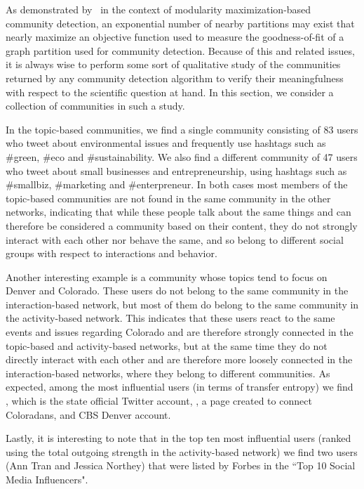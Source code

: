 As demonstrated by~\cite{good2010performance} in the context of modularity maximization-based community detection, an exponential number of nearby partitions may exist that nearly maximize an objective function used to measure the goodness-of-fit of a graph partition used for community detection. Because of this and related issues, it is always wise to perform some sort of qualitative study of the communities returned by any  community detection algorithm to verify their meaningfulness with respect to the scientific question at hand. In this section, we consider a collection of communities in such a study. 

In the topic-based communities, we find a single community consisting of 83 users who tweet about environmental issues and frequently use hashtags such as \#green, \#eco and \#sustainability. We also find a different community of 47 users who tweet about small businesses and entrepreneurship, using hashtags such as \#smallbiz, \#marketing and \#enterpreneur. In both cases most members of the topic-based communities are not found in the same community in the other networks, indicating that while these people talk about the same things and can therefore be considered a community based on their content, they do not strongly interact with each other nor behave the same, and so belong to different social groups with respect to interactions and behavior.

Another interesting example is a community whose topics tend to focus on Denver and Colorado. These users do not belong to the same community in the interaction-based network, but most of them do belong to the same community in the activity-based network. This indicates that these users react to the same events and issues regarding Colorado and are therefore strongly connected in the topic-based and activity-based networks, but at the same time they do not directly interact with each other and are therefore more loosely connected in the interaction-based networks, where they belong to different communities. As expected, among the most influential users (in terms of transfer entropy) we find \@Colorado, which is the state official Twitter account, \@ConnectColorado, a page created to connect Coloradans, and CBS Denver account.

Lastly, it is interesting to note that in the top ten most influential users (ranked using the total outgoing strength in the activity-based network) we find two users (Ann Tran and Jessica Northey) that were listed by Forbes in the ``Top 10 Social Media Influencers".
